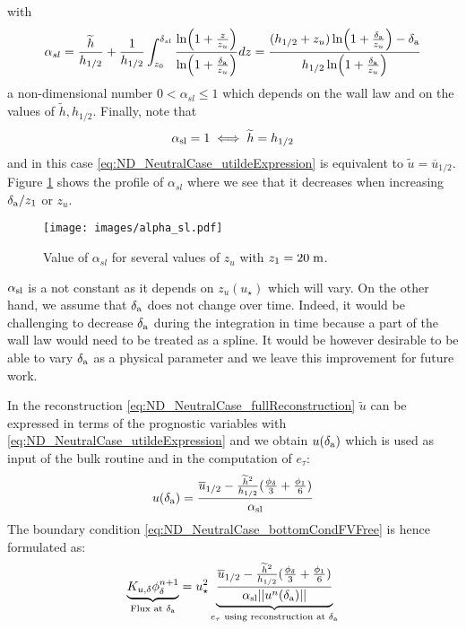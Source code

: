 with 
\begin{equation}
	\alpha_{sl} =
\frac{\widetilde{h}}{{h_{1/2}}} + \frac{1}{{h_{1/2}}}\int_{z_0}^{\delta_{sl}}
\frac{\ln(1+\frac{z}{z_{u}})}{\ln(1+\frac{\delta_{\rm a}}{z_{u}})}dz
= \frac{(h_{1/2} + z_{u})
\ln(1+\frac{\delta_{\rm a}}{z_{u}}) - \delta_{\rm a}}{
	h_{1/2}\ln(1+\frac{\delta_{\rm a}}{z_{u}})}
\end{equation}
a non-dimensional number $0 < \alpha_{sl} \leq 1$
which depends on the wall law and
on the values of $\widetilde{h}, h_{1/2}$. Finally, note that
\begin{equation}
	\alpha_{\rm sl} = 1 \iff \widetilde{h}=h_{1/2}
\end{equation}
and in this case \eqref{eq:ND_NeutralCase_utildeExpression} is
equivalent to $\widetilde{u} = \overline{u}_{1/2}$.
Figure \ref{fig:ND_NeutralCase_alpha_sl} shows the
profile of $\alpha_{sl}$ where we see that it decreases when
increasing $\delta_{\rm a}/z_1$ or $z_u$.
\begin{figure}
	\centering
	\texttt{[image: images/alpha\_sl.pdf]}
	\caption
	{ Value of $\alpha_{sl}$
	for several values of $z_u$ with $z_1=20\;{\rm m}$.
	}
	\label{fig:ND_NeutralCase_alpha_sl}
\end{figure}
\begin{remark}
$\alpha_{\rm sl}$ is a not constant as it depends on $z_u(u_\star)$
which will vary.
On the other hand, we assume that $\delta_{\rm a}$ does not change
over time. Indeed, it would be challenging to decrease
$\delta_{\rm a}$ during the integration in time because a part
of the wall law would need to be treated as a spline.
It would be however desirable to be able to vary $\delta_{\rm a}$
as a physical parameter and we leave this improvement for future work.
\end{remark}
%
In the reconstruction \eqref{eq:ND_NeutralCase_fullReconstruction}
$\widetilde{u}$ can be expressed in terms of the prognostic
variables with \eqref{eq:ND_NeutralCase_utildeExpression}
and we obtain $u(\delta_{\rm a})$ which is used as input
of the bulk routine and in the computation of $e_\tau$:
\begin{equation}
u(\delta_{\rm a})=\frac{\overline{u}_{1/2} -
	\frac{\widetilde{h}^2}{h_{1/2}}
	(\frac{\phi_{\delta}}{3} + \frac{\phi_1}{6})}
	{\alpha_{\rm sl}}
\end{equation}
The boundary condition \eqref{eq:ND_NeutralCase_bottomCondFVFree}
is hence formulated as:
\begin{equation}
	\label{eq:ND_NeutralCase_boundaryCondFVfree}
	\underbrace{K_{u,\delta} {\phi}^{n+1}_{\delta}}_{
		\text{Flux at } \delta_{\rm a}
	} = u_\star^2
	\underbrace{\frac{\overline{u}_{1/2} -
	\frac{\widetilde{h}^2}{h_{1/2}}
	(\frac{\phi_{\delta}}{3} + \frac{\phi_1}{6})}
	{\alpha_{\rm sl}||u^n(\delta_{\rm a}) ||}}_{
		e_\tau \text{ using reconstruction at } \delta_{\rm a}
	}
\end{equation}
